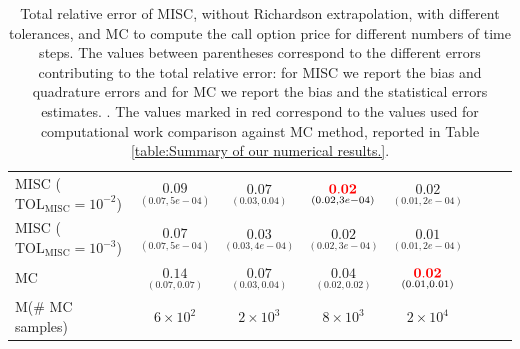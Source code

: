 \begin{table}[h!]
\begin{tabular}{l*{6}{c}r}
		MISC ($\text{TOL}_{\text{MISC}}=10^{-2}$)  &  $\underset{(0.07,5e-04)}{\mathbf{0.09}}$& $\underset{(0.03,0.04)}{\mathbf{0.07}}$& $\underset{(0.02,3e-04)}{\mathbf{ {\color{red}0.02}}}$ & $\underset{(0.01,2e-04)}{\mathbf{ 0.02}}$  \\
		MISC ($\text{TOL}_{\text{MISC}}=10^{-3}$)  &  $\underset{(0.07,5e-04)}{\mathbf{0.07}}$& $\underset{(0.03,4e-04)}{\mathbf{0.03}}$& $\underset{(0.02,3e-04)}{\mathbf{0.02}}$  & $\underset{(0.01,2e-04)}{\mathbf{ 0.01}}$  \\
%
			\hline
		MC    & $\underset{(0.07,0.07)}{\mathbf{0.14}}$  & $\underset{(0.03,0.04)}{\mathbf{0.07}}$  & $\underset{(0.02,0.02)}{\mathbf{0.04}}$ & $\underset{(0.01,0.01)}{\mathbf{{\color{red}0.02}}}$  \\		
			M(\# MC samples)   & $6 \times 10^2$  & $2 \times 10^3$  & $8 \times 10^3$ & $2 \times 10^4$  \\		
		\bottomrule[1.25pt]
	\end{tabular}
	\caption{Total relative error of MISC, without Richardson extrapolation, with  different tolerances,  and MC to compute the call option price  for different numbers of time steps. The values between parentheses correspond to the different errors contributing to the total relative error: for MISC we report the bias and quadrature errors and for MC we report the bias and the statistical errors estimates. . The values marked in red correspond to the values used for computational work comparison against MC method, reported in Table \ref{table:Summary of our numerical results.}.}
	\label{Total error of MISC and MC to compute Call option price of the different tolerances for different number of time steps. Case set 5, without Richardson extrapolation. The numbers between parentheses are the corresponding absolute errors.}
\end{table}

